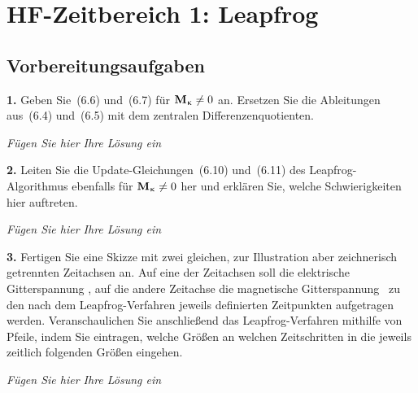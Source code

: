 \documentclass[Protokollheft.tex]{subfiles}
\begin{document}
\chapter{HF-Zeitbereich 1: Leapfrog}
\section{Vorbereitungsaufgaben}



\begin{framed}
	\noindent \textbf{1.} Geben Sie~(6.6) und~(6.7) für $\mathbf{M}_{\upkappa} \neq 0$ an. Ersetzen Sie die Ableitungen aus~(6.4) und~(6.5) mit dem zentralen Differenzenquotienten.\label{exer:updateSchemeNoConductor}
\end{framed}

\emph{Fügen Sie hier Ihre Lösung ein}

\begin{framed}
	\noindent \textbf{2.} Leiten Sie die Update-Gleichungen~(6.10) und~(6.11) des Leapfrog-Algorithmus ebenfalls für ${\mathbf{M}_{\upkappa} \neq 0}$ her und erklären Sie, welche Schwierigkeiten hier auftreten.\label{exer:updateSchemeWithConductor}
\end{framed}

\emph{Fügen Sie hier Ihre Lösung ein}

\begin{framed}
	\noindent \textbf{3.} Fertigen Sie eine Skizze mit zwei gleichen, zur Illustration aber zeichnerisch getrennten Zeitachsen an. Auf eine der Zeitachsen soll die elektrische Gitterspannung \efit, auf die andere Zeitachse die magnetische Gitterspannung \hfit\ zu den nach dem Leapfrog-Verfahren jeweils definierten Zeitpunkten aufgetragen werden. Veranschaulichen Sie anschließend das Leapfrog-Verfahren mithilfe von Pfeile, indem Sie eintragen, welche Größen an welchen Zeitschritten in die jeweils zeitlich folgenden Größen eingehen.\label{exer:LeapfrogOnTimeAxes}
\end{framed}

\emph{Fügen Sie hier Ihre Lösung ein}
\end{document}
